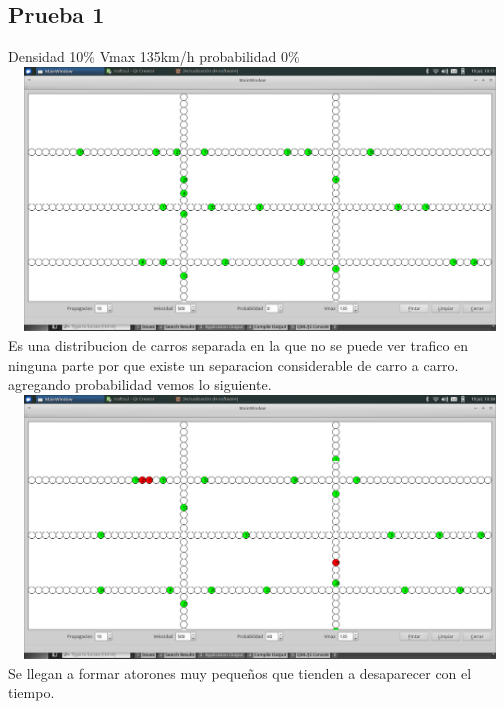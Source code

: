 \documentclass[a4paper,10pt]{article}
\begin{document}
\subsection{Prueba 1}
Densidad 10\% Vmax 135km/h probabilidad 0\%
\\
\includegraphics[width=15cm, height=7cm]{32}
\\
Es una distribucion de carros separada en la que no se puede ver trafico en ninguna parte por que existe un separacion considerable de carro a carro.
agregando probabilidad vemos lo siguiente.
\\
\includegraphics[width=15cm, height=7cm]{33}
\\
Se llegan a formar atorones muy pequeños que tienden a desaparecer con el tiempo.
\end{document}
